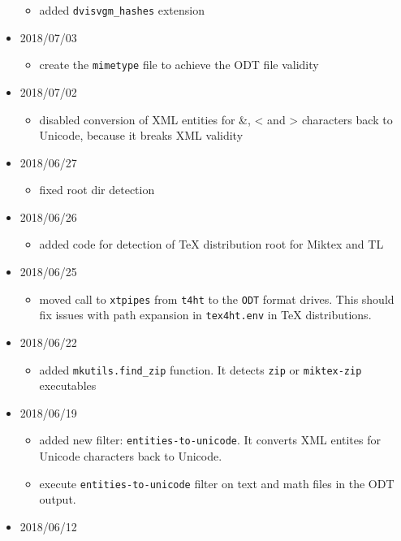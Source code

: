 \begin{itemize}
  \begin{itemize}
  \tightlist
  \item
    added \texttt{dvisvgm\_hashes} extension
  \end{itemize}
\item
  2018/07/03

  \begin{itemize}
  \tightlist
  \item
    create the \texttt{mimetype} file to achieve the ODT file validity
  \end{itemize}
\item
  2018/07/02

  \begin{itemize}
  \tightlist
  \item
    disabled conversion of XML entities for \&, \textless{} and
    \textgreater{} characters back to Unicode, because it breaks XML
    validity
  \end{itemize}
\item
  2018/06/27

  \begin{itemize}
  \tightlist
  \item
    fixed root dir detection
  \end{itemize}
\item
  2018/06/26

  \begin{itemize}
  \tightlist
  \item
    added code for detection of TeX distribution root for Miktex and TL
  \end{itemize}
\item
  2018/06/25

  \begin{itemize}
  \tightlist
  \item
    moved call to \texttt{xtpipes} from \texttt{t4ht} to the
    \texttt{ODT} format drives. This should fix issues with path
    expansion in \texttt{tex4ht.env} in TeX distributions.
  \end{itemize}
\item
  2018/06/22

  \begin{itemize}
  \tightlist
  \item
    added \texttt{mkutils.find\_zip} function. It detects \texttt{zip}
    or \texttt{miktex-zip} executables
  \end{itemize}
\item
  2018/06/19

  \begin{itemize}
  \tightlist
  \item
    added new filter: \texttt{entities-to-unicode}. It converts XML
    entites for Unicode characters back to Unicode.
  \item
    execute \texttt{entities-to-unicode} filter on text and math files
    in the ODT output.
  \end{itemize}
\item
  2018/06/12


\end{itemize}
